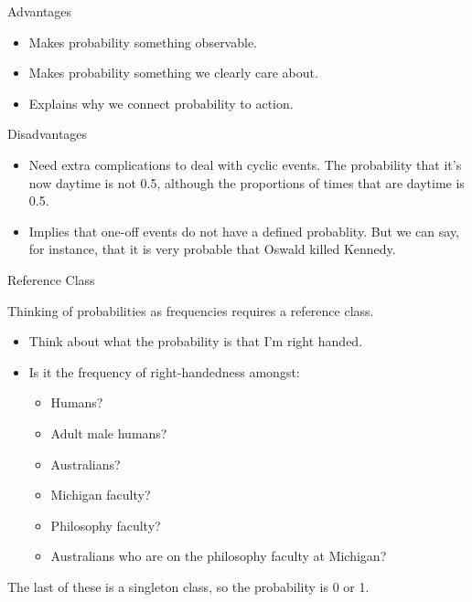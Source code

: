 \documentclass[
  ignorenonframetext,
]{beamer}
\providecommand{\tightlist}{%
  \setlength{\itemsep}{0pt}\setlength{\parskip}{0pt}}
\renewcommand{\,}{\text{, }}
\begin{document}
\begin{frame}{Advantages}
\protect\hypertarget{advantages}{}

\begin{itemize}
\tightlist
\item
  Makes probability something observable. \pause
\item
  Makes probability something we clearly care about. \pause
\item
  Explains why we connect probability to action.
\end{itemize}

\end{frame}

\begin{frame}{Disadvantages}
\protect\hypertarget{disadvantages}{}

\begin{itemize}
\tightlist
\item
  Need extra complications to deal with cyclic events. The probability
  that it's now daytime is not 0.5, although the proportions of times
  that are daytime is 0.5. \pause
\item
  Implies that one-off events do not have a defined probablity. But we
  can say, for instance, that it is very probable that Oswald killed
  Kennedy.
\end{itemize}

\end{frame}

\begin{frame}{Reference Class}
\protect\hypertarget{reference-class}{}

Thinking of probabilities as frequencies requires a reference class.

\begin{itemize}
\tightlist
\item
  Think about what the probability is that I'm right handed.
\item
  Is it the frequency of right-handedness amongst:

  \begin{itemize}
  \tightlist
  \item
    Humans? \pause
  \item
    Adult male humans? \pause
  \item
    Australians? \pause
  \item
    Michigan faculty? \pause
  \item
    Philosophy faculty? \pause
  \item
    Australians who are on the philosophy faculty at Michigan?
  \end{itemize}
\end{itemize}

The last of these is a singleton class, so the probability is 0 or 1.

\end{frame}
\end{document}
